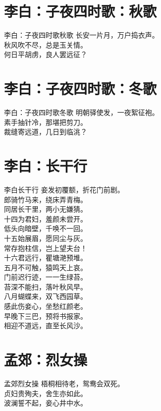 \documentclass[12pt,oneside,a5paper]{book}
\begin{document}
\chapter{李白：子夜四时歌：秋歌}
\begin{poemzh}{李白：子夜四时歌}{秋歌}
长安一片月，万户捣衣声。\\
秋风吹不尽，总是玉关情。\\
何日平胡虏，良人罢远征？\\ 
\end{poemzh}

\chapter{李白：子夜四时歌：冬歌}
\begin{poemzh}{李白：子夜四时歌}{冬歌}
明朝驿使发，一夜絮征袍。\\
素手抽针冷，那堪把剪刀。\\
裁缝寄远道，几日到临洮？\\ 
\end{poemzh}

\chapter{李白：长干行}
\begin{poemzh}{李白}{长干行}
妾发初覆额，折花门前剧。\\
郎骑竹马来，绕床弄青梅。\\
同居长干里，两小无嫌猜。\\
十四为君妇，羞颜未尝开。\\
低头向暗壁，千唤不一回。\\
十五始展眉，愿同尘与灰。\\
常存抱柱信，岂上望夫台！\\
十六君远行，瞿塘滟预堆。\\
五月不可触，猿鸣天上哀。\\
门前迟行迹，一一生绿苔。\\
苔深不能扫，落叶秋风早。\\
八月蝴蝶来，双飞西园草。\\
感此伤妾心，坐愁红颜老。\\
早晚下三巴，预将书报家。\\
相迎不道远，直至长风沙。\\ 
\end{poemzh}

\chapter{孟郊：烈女操}
\begin{poemzh}{孟郊}{烈女操}
梧桐相待老，鸳鸯会双死。\\
贞妇贵殉夫，舍生亦如此。\\
波澜誓不起，妾心井中水。\\ 
\end{poemzh}
\end{document}
